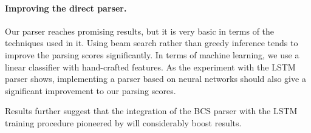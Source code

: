 \documentclass[11pt]{article}
\begin{document}
\paragraph{Improving the direct parser.}
Our parser reaches promising results, but it is very basic in terms of the techniques used in it. Using beam search rather than greedy inference tends to improve the parsing scores significantly.
In terms of machine learning, we use a linear classifier with hand-crafted features. As the experiment with the LSTM parser shows, implementing a parser based on neural networks should also give a significant improvement to our parsing scores.

Results further suggest that
the integration of the BCS parser with the LSTM training procedure
pioneered by  will considerably boost results.





\end{document}
